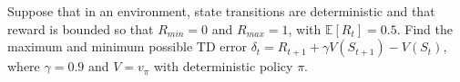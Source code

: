 Suppose that in an environment, state transitions are deterministic and that reward is bounded so that $R_{min} = 0$ and $R_{max} = 1$, with $\mathbb{E}[R_{t}] = 0.5$. Find the maximum and minimum possible TD error $\delta_{t} = R_{t+1} + \gamma V(S_{t+1}) - V(S_{t})$, where $\gamma = 0.9$ and $V = v_{\pi}$ with deterministic policy $\pi$.


